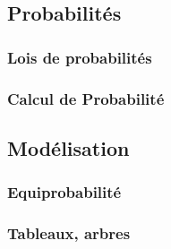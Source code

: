 \documentclass{article}
\begin{document}
\subsection{Probabilités}
\subsubsection{Lois de probabilités}
\subsubsection{Calcul de Probabilité}
\subsection{Modélisation}
\subsubsection{Equiprobabilité}
\subsubsection{Tableaux, arbres}
\end{document}
